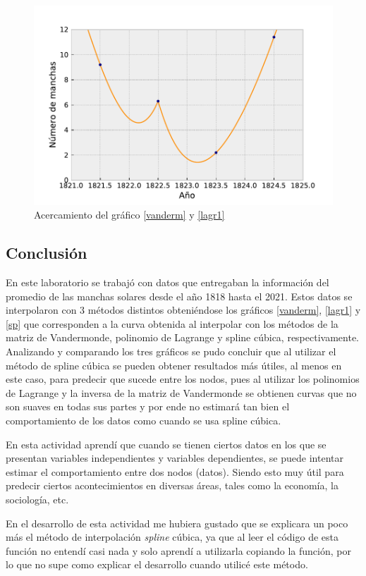 \documentclass[../portafolio.tex]{subfiles}
\begin{document}
\begin{figure}
    \centering
    \includegraphics{tex/img/acercamiento.pdf}
    \caption{Acercamiento del gráfico \ref{vanderm} y \ref{lagr1}}
    \label{acerc}
\end{figure}


\subsection{Conclusión}

En este laboratorio se trabajó con datos que entregaban la información del promedio de las manchas solares desde el año 1818 hasta el 2021. Estos datos se interpolaron con 3 métodos distintos obteniéndose los gráficos \ref{vanderm}, \ref{lagr1} y \ref{sp} que corresponden a la curva obtenida al interpolar con los métodos de la matriz de Vandermonde, polinomio de Lagrange y spline cúbica, respectivamente. Analizando y comparando los tres gráficos se pudo concluir que al utilizar el método de spline cúbica  se pueden obtener resultados más útiles, al menos en este caso, para predecir que sucede entre los nodos, pues al utilizar los polinomios de Lagrange y la inversa de la matriz de Vandermonde se obtienen curvas que no son suaves en todas sus partes y por ende no estimará tan bien el comportamiento de los datos como cuando se usa spline cúbica.

\vspace{2mm}
En esta actividad aprendí que cuando se tienen ciertos datos en los que se presentan variables independientes y variables dependientes, se puede intentar estimar el comportamiento entre dos nodos (datos). Siendo esto muy útil para predecir ciertos acontecimientos en diversas áreas, tales como la economía, la sociología, etc.

\vspace{2mm}
En el desarrollo de esta actividad me hubiera gustado que se explicara un poco más el método de interpolación \textit{spline} cúbica, ya que al leer el código de esta función no entendí casi nada y solo aprendí a utilizarla copiando la función, por lo que no supe como explicar el desarrollo cuando utilicé este método.
\end{document}
